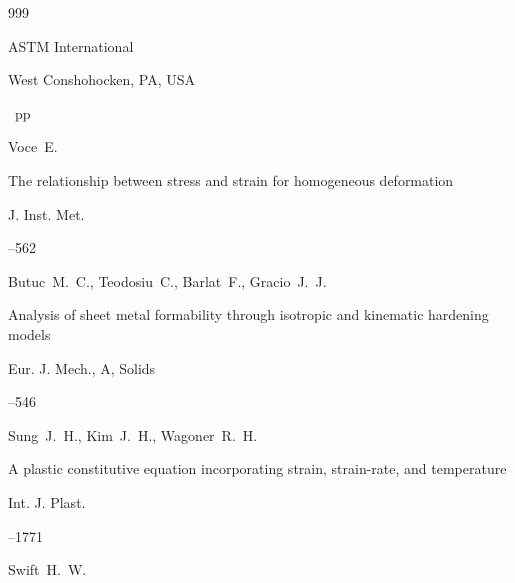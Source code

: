 \begin{thebibliography}{999}

\publ ASTM International

\publaddr West Conshohocken, PA, USA

~pp \nofrills





\by Voce~E.


\paper The relationship between stress and strain for homogeneous deformation

\jour J. Inst. Met.


–562




\by Butuc~M.~C., Teodosiu~C., Barlat~F., Gracio~J.~J.

\paper Analysis of sheet metal formability through isotropic and kinematic hardening models


\jour Eur. J. Mech., A, Solids 



--546 







\by Sung~J.~H., Kim~J.~H., Wagoner~R.~H.

\paper A plastic constitutive equation incorporating strain, strain-rate, and temperature


\jour Int. J. Plast. 



--1771 







\by  Swift~H.~W.


\end{thebibliography}
